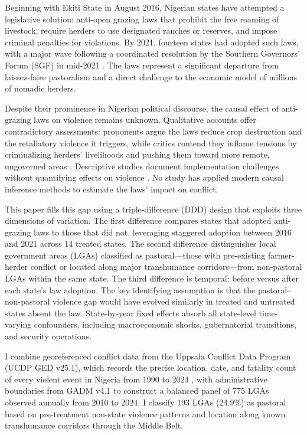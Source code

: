 \documentclass[12pt]{article}
\begin{document}
Beginning with Ekiti State in August 2016, Nigerian states have attempted a legislative solution: anti-open grazing laws that prohibit the free roaming of livestock, require herders to use designated ranches or reserves, and impose criminal penalties for violations. By 2021, fourteen states had adopted such laws, with a major wave following a coordinated resolution by the Southern Governors' Forum (SGF) in mid-2021 \citep{ajala2020anti, ochonu2022anti}. The laws represent a significant departure from laissez-faire pastoralism and a direct challenge to the economic model of millions of nomadic herders.

Despite their prominence in Nigerian political discourse, the causal effect of anti-grazing laws on violence remains unknown. Qualitative accounts offer contradictory assessments: proponents argue the laws reduce crop destruction and the retaliatory violence it triggers, while critics contend they inflame tensions by criminalizing herders' livelihoods and pushing them toward more remote, ungoverned areas \citep{akinyetun2021institutional, adelakun2023evaluating}. Descriptive studies document implementation challenges without quantifying effects on violence \citep{ajala2020anti}. No study has applied modern causal inference methods to estimate the laws' impact on conflict.

This paper fills this gap using a triple-difference (DDD) design that exploits three dimensions of variation. The first difference compares states that adopted anti-grazing laws to those that did not, leveraging staggered adoption between 2016 and 2021 across 14 treated states. The second difference distinguishes local government areas (LGAs) classified as pastoral---those with pre-existing farmer-herder conflict or located along major transhumance corridors---from non-pastoral LGAs within the same state. The third difference is temporal: before versus after each state's law adoption. The key identifying assumption is that the pastoral--non-pastoral violence gap would have evolved similarly in treated and untreated states absent the law. State-by-year fixed effects absorb all state-level time-varying confounders, including macroeconomic shocks, gubernatorial transitions, and security operations.

I combine georeferenced conflict data from the Uppsala Conflict Data Program (UCDP GED v25.1), which records the precise location, date, and fatality count of every violent event in Nigeria from 1990 to 2024 \citep{sundberg2013introducing, pettersson2023organized}, with administrative boundaries from GADM v4.1 to construct a balanced panel of 775 LGAs observed annually from 2010 to 2024. I classify 193 LGAs (24.9\%) as pastoral based on pre-treatment non-state violence patterns and location along known transhumance corridors through the Middle Belt.
\end{document}
